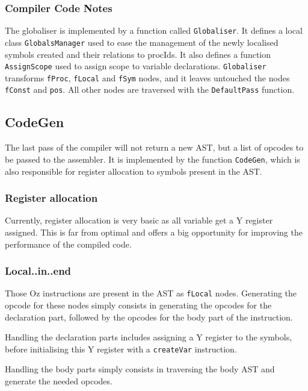 \documentclass[a4paper]{memoir}
\begin{document}
\subsubsection{Compiler Code Notes}
The globaliser is implemented by a function called \lstinline!Globaliser!. It
defines a local class \lstinline!GlobalsManager! used to ease the management of
the newly localised symbols created and their relations to procIds. It also
defines a function \lstinline!AssignScope! used to assign scope to variable
declarations. \lstinline!Globaliser! transforms \lstinline!fProc!,
\lstinline!fLocal! and \lstinline!fSym! nodes, and it leaves untouched the nodes
\lstinline!fConst! and \lstinline!pos!. All other nodes are traversed with the
\lstinline!DefaultPass! function.

\subsection{CodeGen}\label{sec:arch:codegen}
The last pass of the compiler will not return a new AST, but a list of opcodes to be passed to the assembler. It is implemented by the function \lstinline!CodeGen!, which is also responsible for register allocation to symbols present in the AST.

\subsubsection{Register allocation}
Currently, register allocation is very basic as all variable get a Y register assigned. This is far from optimal and offers a big opportunity for improving the performance of the compiled code.

\subsubsection{Local..in..end}\label{sec:arch:codegen:localin}
Those Oz instructions are present in the AST as \lstinline!fLocal! nodes.
Generating the opcode for these nodes simply consists in generating the opcodes
for the declaration part, followed by the opcodes for the body part of the
instruction.

Handling the declaration parts includes assigning a Y register to the symbols,
before initialising this Y register with a \lstinline!createVar! instruction.

Handling the body parts simply consists in traversing the body AST and generate
the needed opcodes.
\end{document}
